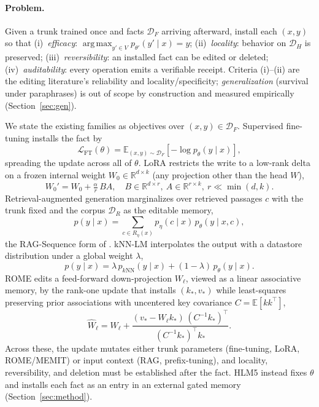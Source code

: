 \documentclass[11pt]{article}
\theoremstyle{remark}
\DeclareMathOperator*{\argmax}{arg\,max}
\newcommand{\R}{\mathbb{R}}
\newcommand{\E}{\mathbb{E}}
\newcommand{\Df}{\mathcal{D}_F}
\newcommand{\Dh}{\mathcal{D}_H}
\newcommand{\Dr}{\mathcal{D}_R}
\begin{document}
\paragraph{Problem.} Given a trunk trained once and facts $\Df$ arriving
afterward, install each $(x,y)$ so that (i)~\emph{efficacy}:
$\argmax_{y'\in V} p_{\theta'}(y'\mid x)=y$; (ii)~\emph{locality}: behavior on
$\Dh$ is preserved; (iii)~\emph{reversibility}: an installed fact can be edited or
deleted; (iv)~\emph{auditability}: every operation emits a verifiable receipt.
Criteria (i)--(ii) are the editing literature's reliability and
locality/specificity; \emph{generalization} (survival under paraphrases) is out
of scope by construction and measured empirically (Section~\ref{sec:gen}).

We state the existing families as objectives over $(x,y)\in\Df$. Supervised
fine-tuning installs the fact by
\begin{equation}
\mathcal{L}_{\mathrm{FT}}(\theta)=\E_{(x,y)\sim\Df}\!\left[-\log p_\theta(y\mid x)\right],
\end{equation}
spreading the update across all of $\theta$. LoRA restricts the write to a
low-rank delta on a frozen internal weight $W_0\in\R^{d\times k}$ (any projection
other than the head $W$),
\begin{equation}
W_0' = W_0 + \tfrac{\alpha}{r}\,BA,\quad B\in\R^{d\times r},\ A\in\R^{r\times k},\ r\ll\min(d,k).
\end{equation}
Retrieval-augmented generation marginalizes over retrieved passages $c$ with the
trunk fixed and the corpus $\Dr$ as the editable memory,
\begin{equation}
p(y\mid x)=\sum_{c\in R_\eta(x)} p_\eta(c\mid x)\, p_\theta(y\mid x,c),
\end{equation}
the RAG-Sequence form of \citet{lewis2020rag}. kNN-LM interpolates the output with
a datastore distribution under a global weight $\lambda$,
\begin{equation}
p(y\mid x)=\lambda\, p_{k\mathrm{NN}}(y\mid x)+(1-\lambda)\,p_\theta(y\mid x).
\end{equation}
ROME edits a feed-forward down-projection $W_\ell$, viewed as a linear
associative memory, by the rank-one update that installs $(k_*,v_*)$ while
least-squares preserving prior associations with uncentered key covariance
$C=\E[kk^{\top}]$,
\begin{equation}
\widehat{W}_\ell = W_\ell + \frac{(v_*-W_\ell k_*)\,(C^{-1}k_*)^{\top}}{(C^{-1}k_*)^{\top}k_*}.
\end{equation}
Across these, the update mutates either trunk parameters (fine-tuning, LoRA,
ROME/MEMIT) or input context (RAG, prefix-tuning), and locality, reversibility,
and deletion must be established after the fact. HLM5 instead fixes $\theta$ and installs each fact as
an entry in an external gated memory (Section~\ref{sec:method}).
\end{document}

